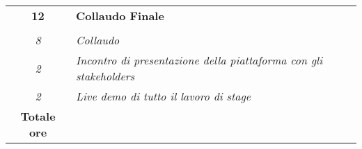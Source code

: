 \begin{tabularx}{\textwidth}{|c|X|}
    \textbf{12} & \textbf{Collaudo Finale}  \\ \hdashline 
    \multirow{4}{0cm}\\ 
    \textit{8} & 
    \textit{Collaudo} \\
    \textit{2} & 
    \textit{Incontro di presentazione della piattaforma con gli stakeholders} \\
    \textit{2} & 
    \textit{Live demo di tutto il lavoro di stage} \\
    \hline
	
	\textbf{Totale ore} & \multicolumn{1}{|c|}{\textbf{\totaleOre}} \\\hline
	
	
\end{tabularx}